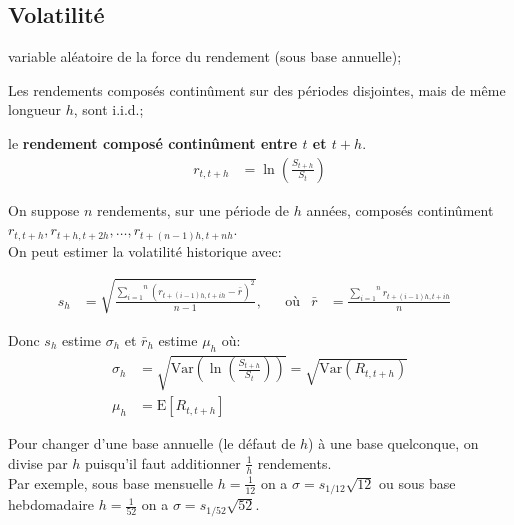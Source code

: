 \documentclass[10pt, french]{article}
\begin{document}
\begin{multicols*}{2}
	
\subsection{Volatilité}

\begin{distributions}[Notation]
\begin{description}[leftmargin = *]
	\item[$R$]	variable aléatoire de la force du rendement (sous base annuelle);
	\item[Hypothèse]	Les rendements composés continûment sur des périodes disjointes, mais de même longueur $h$, sont i.i.d.;
	\item[$r_{t, t + h}$]	le \textbf{rendement composé continûment entre $t$ et $t + h$}.
		\begin{align*}
		r_{t, t + h} &= \ln\left(\frac{S_{t + h}}{S_{t}}\right)
		\end{align*}
\end{description}
\end{distributions}

On suppose $n$ rendements, sur une période de $h$ années, composés continûment $r_{t, t + h}, r_{t + h, t + 2h}, \dots, r_{t + (n - 1)h, t + nh}$. \\
On peut estimer la volatilité historique avec:

\begin{align*}
	s_{h}
	&=	\sqrt{\frac{\overset{n}{\underset{i = 1}{\sum}} (r_{t + (i - 1)h, t + ih} - \bar{r})^{2}}{n - 1}}, &
	&\text{où}&
	\bar{r}
	&=	\frac{\overset{n}{\underset{i = 1}{\sum}} r_{t + (i - 1)h, t + ih}}{n}	&
\end{align*}

Donc $s_{h}$ estime $\sigma_{h}$ et $\bar{r}_{h}$ estime $\mu_{h}$ où:
	\begin{align*}
	\sigma_{h}
	&=	\sqrt{\text{Var}\left(\ln\left( \frac{S_{t + h}}{S_{t}} \right)\right)}	
	=	\sqrt{\text{Var}(R_{t, t + h})}	\\
	\mu_{h}
	&=	\text{E}[R_{t, t + h}]
	\end{align*}

Pour changer d'une base annuelle (le défaut de $h$) à une base quelconque, on divise par $h$ puisqu'il faut additionner $\frac{1}{h}$ rendements. \\
Par exemple, sous base mensuelle $h = \frac{1}{12}$ on a $\sigma = s_{1/12}\sqrt{12}$ ou sous base hebdomadaire $h = \frac{1}{52}$ on a $\sigma = s_{1/52}\sqrt{52}$.

\newpage


\end{multicols*}
\end{document}
